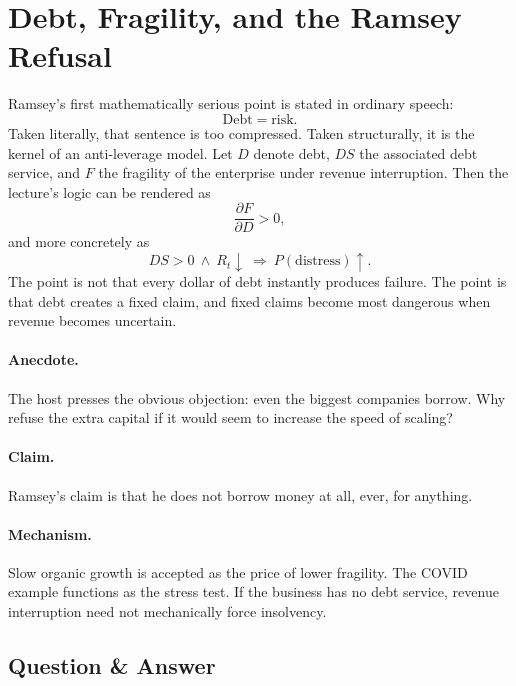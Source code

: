 \section{Debt, Fragility, and the Ramsey Refusal}

Ramsey's first mathematically serious point is stated in ordinary speech:
\begin{equation}
\text{Debt} = \text{risk}.
\end{equation}
Taken literally, that sentence is too compressed. Taken structurally, it is the kernel of an anti-leverage model. Let \(D\) denote debt, \(DS\) the associated debt service, and \(F\) the fragility of the enterprise under revenue interruption. Then the lecture's logic can be rendered as
\begin{equation}
\frac{\partial F}{\partial D} > 0,
\end{equation}
and more concretely as
\begin{equation}
DS>0 \ \land\ R_t\downarrow \ \Rightarrow\ P(\text{distress})\uparrow.
\end{equation}
The point is not that every dollar of debt instantly produces failure. The point is that debt creates a fixed claim, and fixed claims become most dangerous when revenue becomes uncertain.

\paragraph{Anecdote.} The host presses the obvious objection: even the biggest companies borrow. Why refuse the extra capital if it would seem to increase the speed of scaling?

\paragraph{Claim.} Ramsey's claim is that he does not borrow money at all, ever, for anything.

\paragraph{Mechanism.} Slow organic growth is accepted as the price of lower fragility. The COVID example functions as the stress test. If the business has no debt service, revenue interruption need not mechanically force insolvency.

\subsection{Question \& Answer}

